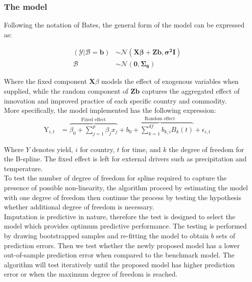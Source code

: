 \documentclass[nojss]{jss}\usepackage[]{graphicx}\usepackage[]{color}
\begin{document}
\subsubsection{The model}
Following the notation of Bates, the general form of the model can be
expressed as:

\begin{align}
  (\mathscr{Y}|\mathscr{B} = \mathbf{b}) &\sim
  \mathscr{N}(\mathbf{X}\boldsymbol{\beta} + \mathbf{Z}\mathbf{b},
  \boldsymbol{\sigma^2}\mathbf{I})\nonumber \\
  \mathscr{B} &\sim\mathscr{N}(\mathbf{0}, \boldsymbol{\Sigma_\theta})
\end{align}

Where the fixed component $\mathbf{X}\mathscr{\beta}$ models the
effect of exogenous variables when supplied, while the random
component of $\mathbf{Z}\mathbf{b}$ captures the aggregated effect of
innovation and improved practice of each specific country and
commodity. \\

More specifically, the model implemented has the following expression:
\begin{align}
  \label{eq:lmeImpute}
  \text{Y}_{i,t} &= \overbrace{\beta_0 + \sum_{j=1}^{p}\beta_j x_j}^{\text{Fixed effect}} +
  \overbrace{b_{0} + \sum_{k=1}^{df}b_{k, i}B_{k}(t)}^{\text{Random effect}} +
  \epsilon_{i,t}
\end{align}

Where $Y$ denotes yield, $i$ for country, $t$ for time, and $k$ the
degree of freedom for the B-spline. The fixed effect is left for
external drivers such as precipitation and temperature.\\


To test the number of degree of freedom for spline required to capture
the presence of possible non-linearity, the algorithm proceed by
estimating the model with one degree of freedom then continue the
process by testing the hypothesis whether additional degree of freedom
is necessary.\\

Imputation is predictive in nature, therefore the test is designed to
select the model which provides optimum predictive performance. The
testing is performed by drawing bootstrapped samples and re-fitting
the model to obtain $b$ sets of prediction errors. Then we test
whether the newly proposed model has a lower out-of-sample prediction
error when compared to the benchmark model. The algorithm will test
iteratively until the proposed model has higher prediction error or
when the maximum degree of freedom is reached.\\
\end{document}

